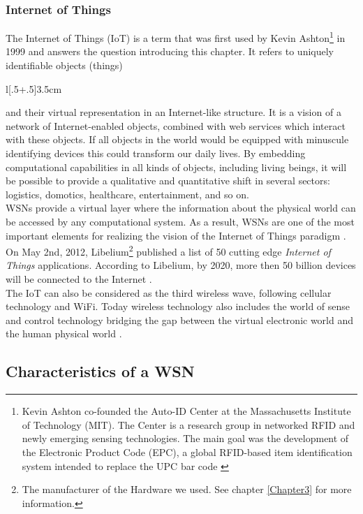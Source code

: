 \subsubsection{Internet of Things}
The Internet of Things (IoT) is a term that was first used by Kevin Ashton\footnote{Kevin Ashton co-founded the Auto-ID Center at the  Massachusetts Institute of Technology (MIT). The Center is a research group in networked RFID and newly emerging sensing technologies. The main goal was the development of the Electronic Product Code (EPC), a global RFID-based item identification system intended to replace the UPC bar code \citep{AUTO}} in 1999 and answers the question introducing this chapter. It refers to uniquely identifiable objects (things) \begin{wrapfigure}[9]{l}[\dimexpr.5\width+.5\columnsep\relax]{3.5cm}
\vfill
\end{wrapfigure} and their virtual representation in an Internet-like structure. It is a vision of a network of Internet-enabled objects, combined with web services which interact with these objects. If all objects in the world would be equipped with minuscule identifying devices this could transform our daily lives. By embedding computational capabilities in all kinds of objects, including living beings, it will be possible to provide a qualitative and quantitative shift in several sectors: logistics, domotics, healthcare, entertainment, and so on.\\
WSNs provide a virtual layer where the information about the physical world can be accessed by any computational system. As a result, WSNs are one of the most important elements for realizing the vision of the Internet of Things paradigm \citep{ALCA}. On May 2nd, 2012, Libelium\footnote{The manufacturer of the Hardware we used. See chapter \ref{Chapter3} for more information.} published a list of 50 cutting edge \emph{Internet of Things} applications. According to Libelium, by 2020, more then 50 billion devices will be connected to the Internet \citep{50}.\\
The IoT can also be considered as the third wireless wave, following cellular technology and WiFi. Today wireless technology also includes the world of sense and control technology bridging the gap between the virtual electronic world and the human physical world \citep{ATLANTIC}.
\subsection{Characteristics of a WSN}
